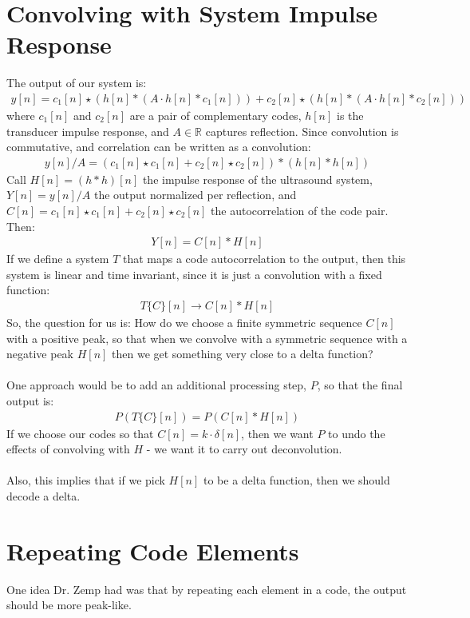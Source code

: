\documentclass[a4paper]{article}
\newcommand{\op}[2]{#1\{#2\}}
\begin{document}
\section*{Convolving with System Impulse Response}
The output of our system is:
\begin{align*}
y[n] = c_1[n] \star (h[n] * (A \cdot h[n] * c_1[n])) + c_2[n] \star (h[n] * (A \cdot h[n] * c_2[n]))
\end{align*}
where $c_1[n]$ and $c_2[n]$ are a pair of complementary codes, $h[n]$ is the transducer impulse response, and $A \in \mathbb{R}$ captures reflection. Since convolution is commutative, and correlation can be written as a convolution:
\begin{align*}
y[n]/A = (c_1[n] \star c_1[n] + c_2[n] \star c_2[n]) * (h[n] * h[n])
\end{align*}
Call $H[n] = (h*h)[n]$ the impulse response of the ultrasound system, $Y[n] = y[n]/A$ the output normalized per reflection, and $C[n] = c_1[n] \star c_1[n] + c_2[n] \star c_2[n]$ the autocorrelation of the code pair. Then:
\begin{align*}
Y[n] = C[n]*H[n]
\end{align*}
If we define a system $T$ that maps a code autocorrelation to the output, then this system is linear and time invariant, since it is just a convolution with a fixed function:
\begin{align*}
\op{T}{C}[n] \rightarrow C[n] * H[n]
\end{align*}
So, the question for us is: How do we choose a finite symmetric sequence $C[n]$ with a positive peak, so that when we convolve with a symmetric sequence with a negative peak $H[n]$ then we get something very close to a delta function? 
\\\\
One approach would be to add an additional processing step, $P$, so that the final output is:
\begin{align*}
P(\op{T}{C}[n]) = P(C[n]*H[n])
\end{align*} If we choose our codes so that $C[n] = k \cdot \delta[n]$, then we want $P$ to undo the effects of convolving with $H$ - we want it to carry out deconvolution.
\\\\
Also, this implies that if we pick $H[n]$ to be a delta function, then we should decode a delta.
\section*{Repeating Code Elements}
One idea Dr. Zemp had was that by repeating each element in a code, the output should be more peak-like.
\end{document}
